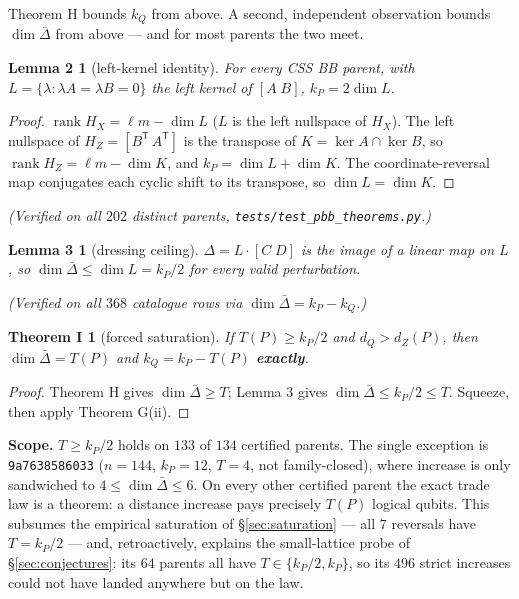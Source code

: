 \documentclass[11pt]{article}
\theoremstyle{plain}
\newtheorem*{lemma2}{Lemma 2}
\newtheorem*{lemma3}{Lemma 3}
\newtheorem*{theoremI}{Theorem I}
\theoremstyle{remark}
\begin{document}
Theorem H bounds $k_Q$ from above. A second, independent observation bounds
$\dim\bar\Delta$ from above --- and for most parents the two meet.

\begin{lemma2}[left-kernel identity]
For every CSS BB parent, with
$L=\{\lambda:\lambda A=\lambda B=0\}$ the left kernel of $[A\;B]$,
$k_P = 2\dim L$.
\end{lemma2}

\begin{proof}
$\operatorname{rank}H_X=\ell m-\dim L$ ($L$ is the left nullspace of
$H_X$). The left nullspace of $H_Z=[B^{\mathsf T}\,A^{\mathsf T}]$ is the
transpose of $K=\ker A\cap\ker B$, so $\operatorname{rank}H_Z=\ell m-\dim K$,
and $k_P=\dim L+\dim K$. The coordinate-reversal map conjugates each cyclic
shift to its transpose, so $\dim L=\dim K$.
\end{proof}

\emph{(Verified on all $202$ distinct parents, \texttt{tests/test\_pbb\_theorems.py}.)}

\begin{lemma3}[dressing ceiling]
$\Delta=L\cdot[C\;D]$ is the image of a
linear map on $L$, so $\dim\bar\Delta\le\dim L=k_P/2$ for every valid
perturbation.
\end{lemma3}
\emph{(Verified on all $368$ catalogue rows via $\dim\bar\Delta=k_P-k_Q$.)}

\begin{theoremI}[forced saturation]
If $T(P)\ge k_P/2$ and $d_Q>d_Z(P)$, then
$\dim\bar\Delta=T(P)$ and $k_Q=k_P-T(P)$ \textbf{exactly}.
\end{theoremI}

\begin{proof}
Theorem H gives $\dim\bar\Delta\ge T$; Lemma 3 gives
$\dim\bar\Delta\le k_P/2\le T$. Squeeze, then apply Theorem G(ii).
\end{proof}

\textbf{Scope.} $T\ge k_P/2$ holds on $133$ of $134$ certified parents. The single
exception is \texttt{9a7638586033} ($n=144$, $k_P=12$, $T=4$, not family-closed),
where increase is only sandwiched to $4\le\dim\bar\Delta\le 6$. On every other
certified parent the exact trade law is a theorem: a distance increase pays
precisely $T(P)$ logical qubits. This subsumes the empirical saturation of \S\ref{sec:saturation}
--- all $7$ reversals have $T=k_P/2$ --- and, retroactively, explains the
small-lattice probe of \S\ref{sec:conjectures}: its $64$ parents all have $T\in\{k_P/2,k_P\}$, so
its $496$ strict increases could not have landed anywhere but on the law.
\end{document}
